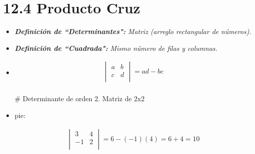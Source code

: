 \section{12.4 Producto Cruz}
\begin{itemize}
    \item \emph{\textbf{Definición de ``Determinantes":} Matriz (arreglo rectangular de números).}
    \item \emph{\textbf{Definición de ``Cuadrada":} Mismo número de filas y columnas. }
    \item \begin{center}
        \begin{align*}
            \begin{vmatrix}
                a & b \\ 
                c & d \\ 
            \end{vmatrix} = ad - bc \\ 
        \end{align*}
    \end{center}
    \# Determinante de orden 2. Matriz de 2x2 
    
    \item pie:
        \begin{center}
            \begin{align*}
                \begin{vmatrix}
                    3 & 4 \\ 
                    -1 & 2 \\ 
                \end{vmatrix}
                = 6 - (-1) (4) = 6 + 4 = 10 \\ 
            \end{align*}
        \end{center}
    

\end{itemize}
